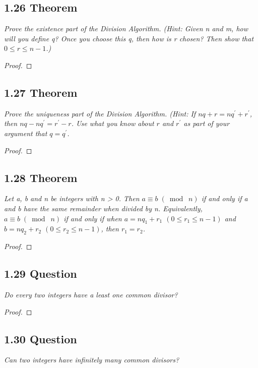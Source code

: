 \documentclass{article}
\begin{document}
\subsection*{1.26 Theorem} 
\quad \textit{Prove the existence part of the Division Algorithm. (Hint: Given n and m, how will you define q? Once you choose this q, then how is r chosen? Then show that $0 \leq r \leq n -1$.)}

\begin{proof}

\end{proof}

\subsection*{1.27 Theorem} 
\quad \textit{Prove the uniqueness part of the Division Algorithm. (Hint: If $nq+r = nq^{'}+r^{'}$, then $nq-nq^{'}=r^{'}-r$. Use what you know about $r$ and $r^{'}$ as part of your argument that $q = q^{'}$.}

\begin{proof}
\end{proof}

\subsection*{1.28 Theorem} 
\quad \textit{Let a, b and n be integers with n > 0.  Then $a \equiv b \;(\bmod\; n)$ if and only if a and b have the same remainder when divided by n. Equivalently, $a \equiv b \;(\bmod\; n)$ if and only if when $a=nq_1+r_1$ $(0\leq r_1 \leq n-1)$ and $b = nq_2+r_2$ $ (0\leq r_2 \leq n-1)$, then $r_1=r_2$.}

\begin{proof}
\end{proof}

\subsection*{1.29 Question} 
\quad \textit{Do every two integers have a least one common divisor?}

\begin{proof}
\end{proof}

\subsection*{1.30 Question} 
\quad \textit{Can two integers have infinitely many common divisors?}
\end{document}
